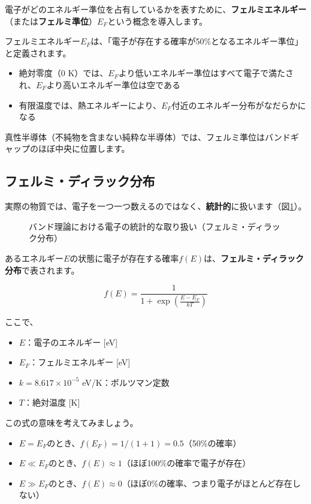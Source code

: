 電子がどのエネルギー準位を占有しているかを表すために、\textbf{フェルミエネルギー}（または\textbf{フェルミ準位}）$E_F$という概念を導入します。

フェルミエネルギー$E_F$は、「電子が存在する確率が50\%となるエネルギー準位」と定義されます。

\begin{itemize}
\item 絶対零度（0 K）では、$E_F$より低いエネルギー準位はすべて電子で満たされ、$E_F$より高いエネルギー準位は空である
\item 有限温度では、熱エネルギーにより、$E_F$付近のエネルギー分布がなだらかになる
\end{itemize}

真性半導体（不純物を含まない純粋な半導体）では、フェルミ準位はバンドギャップのほぼ中央に位置します。

\subsection{フェルミ・ディラック分布}

実際の物質では、電子を一つ一つ数えるのではなく、\textbf{統計的}に扱います（図\ref{fig:fermi_dirac}）。

\begin{figure}[H]
\centering
{}
\caption{バンド理論における電子の統計的な取り扱い（フェルミ・ディラック分布）}
\label{fig:fermi_dirac}
\end{figure}

あるエネルギー$E$の状態に電子が存在する確率$f(E)$は、\textbf{フェルミ・ディラック分布}で表されます。

\begin{equation}
f(E) = \frac{1}{1 + \exp\left(\frac{E - E_F}{kT}\right)}
\end{equation}

ここで、
\begin{itemize}
\item $E$：電子のエネルギー [eV]
\item $E_F$：フェルミエネルギー [eV]
\item $k = 8.617 \times 10^{-5}$ eV/K：ボルツマン定数
\item $T$：絶対温度 [K]
\end{itemize}

この式の意味を考えてみましょう。

\begin{itemize}
\item $E = E_F$のとき、$f(E_F) = 1/(1+1) = 0.5$（50\%の確率）
\item $E \ll E_F$のとき、$f(E) \approx 1$（ほぼ100\%の確率で電子が存在）
\item $E \gg E_F$のとき、$f(E) \approx 0$（ほぼ0\%の確率、つまり電子がほとんど存在しない）
\end{itemize}

